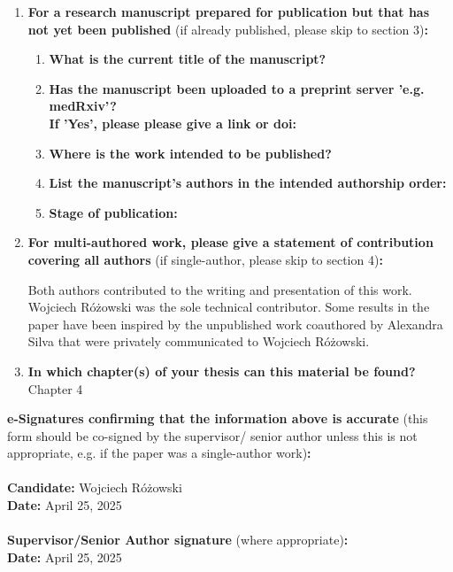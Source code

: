 \begin{enumerate}
\begin{enumerate}
\begin{itemize}
			\end{itemize}
%		
		\end{enumerate}
%	
		\item \textbf{For a research manuscript prepared for publication but that has not yet been published} (if already published, please skip to section 3)\textbf{:}
%		
		\begin{enumerate}\itemsep0em
			\item \textbf{What is the current title of the manuscript?}
			\item \textbf{Has the manuscript been uploaded to a preprint server 'e.g. medRxiv'? 
			\\
			If 'Yes', please please give a link or doi:}
			\item \textbf{Where is the work intended to be published?}
			\item \textbf{List the manuscript's authors in the intended authorship order:}
			\item \textbf{Stage of publication:}
		\end{enumerate}
		
		\item \textbf{For multi-authored work, please give a statement of contribution covering all authors} (if single-author, please skip to section 4)\textbf{:}
		
		Both authors contributed to the writing and presentation of this work.
		Wojciech R\'{o}\.{z}owski was the sole technical contributor. Some results in the paper have been inspired by the unpublished work coauthored by Alexandra Silva that were privately communicated to Wojciech R\'{o}\.{z}owski.


		\item \textbf{In which chapter(s) of your thesis can this material be found?}\\
		Chapter 4
	\end{enumerate}

		\textbf{e-Signatures confirming that the information above is accurate}
		(this form should be co-signed by the supervisor/ senior author unless this is not appropriate, e.g. if the paper was a single-author work)\textbf{:}\\
		\textbf{}\\ 
		\textbf{Candidate:}  Wojciech R\'{o}\.{z}owski\\
		\textbf{Date:} April 25, 2025\\
		\textbf{}\\
		\textbf{Supervisor/Senior Author signature} (where appropriate)\textbf{:}\\
		\textbf{Date:} April 25, 2025


